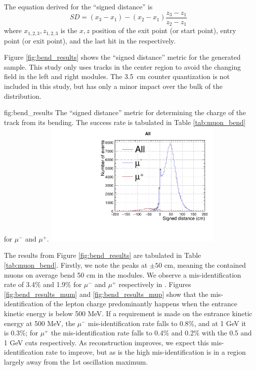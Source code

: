 The equation derived for the ``signed distance'' is
\begin{equation}
    SD = (x_3-x_1) - (x_2-x_1)\frac{z_3-z_1}{z_2-z_1}
\end{equation}
where $x_{1,2,3},z_{1,2,3}$ is the $x,z$ position of the  exit point (or  start point),  entry point (or  exit point), and the last hit in the  respectively.

Figure \ref{fig:bend_results} shows the ``signed distance'' metric for the generated  sample. This study only uses tracks in the center region to avoid the changing field in the left and right modules. The 3.5~cm counter quantization is not included in this study, but has only a minor impact over the bulk of the distribution.

\begin{dunefigure}{fig:bend_results}
{The ``signed distance'' metric for determining the charge of the track from its bending. The success rate is tabulated in 
Table \ref{tab:muon_bend} for $\mu^-$ and $\mu^+$.}
\includegraphics[width=0.65\textwidth, clip, trim={0mm 0mm 0mm 10mm}]{graphics/tms/Simulation/Bend/cmetric_signed_distance.pdf}
\end{dunefigure}

The results from Figure \ref{fig:bend_results} are tabulated in Table \ref{tab:muon_bend}. Firstly, we note the peaks at $\pm50\text{ cm}$, meaning the contained muons on average bend 50 cm in the modules. We observe a mis-identification rate of 3.4\% and 1.9\% for $\mu^-$ and $\mu^+$ respectively in . Figures \ref{fig:bend_results_mum} and \ref{fig:bend_results_mup} show that the mis-identification of the lepton charge predominantly happens when the  entrance kinetic energy is below 500 MeV. If a requirement is made on the  entrance kinetic energy at 500 MeV, the $\mu^-$ mis-identification rate falls to 0.8\%, and at 1 GeV it is 0.3\%; for $\mu^+$ the mis-identification rate falls to 0.4\% and 0.2\% with the 0.5 and 1 GeV cuts respectively. As reconstruction improves, we expect this mis-identification rate to improve, but as is the high mis-identification is in a region largely away from the 1st oscillation maximum. 

